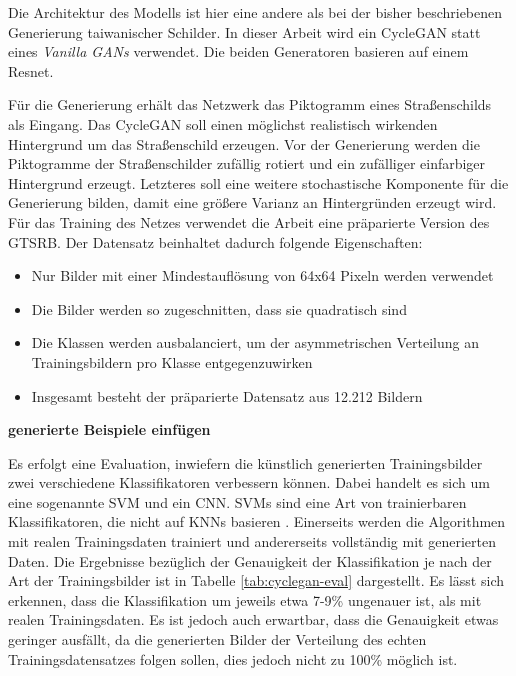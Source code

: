 Die Architektur des Modells ist hier eine andere als bei der bisher beschriebenen Generierung taiwanischer Schilder. In dieser Arbeit wird ein \ac{CycleGAN} statt eines \emph{Vanilla \acp{GAN}} verwendet. Die beiden Generatoren basieren auf einem Resnet. \cite{GTSRB} \cite{gtsrbGAN}

Für die Generierung erhält das Netzwerk das Piktogramm eines Straßenschilds als Eingang. Das \ac{CycleGAN} soll einen möglichst realistisch wirkenden Hintergrund um das Straßenschild erzeugen. Vor der Generierung werden die Piktogramme der Straßenschilder zufällig rotiert und ein zufälliger einfarbiger Hintergrund erzeugt. Letzteres soll eine weitere stochastische Komponente für die Generierung bilden, damit eine größere Varianz an Hintergründen erzeugt wird. Für das Training des Netzes verwendet die Arbeit eine präparierte Version des \ac{GTSRB}. Der Datensatz beinhaltet dadurch folgende Eigenschaften:
\begin{itemize}
    \item Nur Bilder mit einer Mindestauflösung von 64x64 Pixeln werden verwendet
    \item Die Bilder werden so zugeschnitten, dass sie quadratisch sind
    \item Die Klassen werden ausbalanciert, um der asymmetrischen Verteilung an Trainingsbildern pro Klasse entgegenzuwirken
    \item Insgesamt besteht der präparierte Datensatz aus 12.212 Bildern
  \end{itemize}
\cite{gtsrbGAN}

\textbf{generierte Beispiele einfügen}

Es erfolgt eine Evaluation, inwiefern die künstlich generierten Trainingsbilder zwei verschiedene Klassifikatoren verbessern können. Dabei handelt es sich um eine sogenannte \ac{SVM} und ein \ac{CNN}. \acp{SVM} sind eine Art von trainierbaren Klassifikatoren, die nicht auf \acp{KNN} basieren \cite{visualApproach}. Einerseits werden die Algorithmen mit realen Trainingsdaten trainiert und andererseits vollständig mit generierten Daten. Die Ergebnisse bezüglich der Genauigkeit der Klassifikation je nach der Art der Trainingsbilder ist in Tabelle \ref{tab:cyclegan-eval} dargestellt. Es lässt sich erkennen, dass die Klassifikation um jeweils etwa 7-9\% ungenauer ist, als mit realen Trainingsdaten. Es ist jedoch auch erwartbar, dass die Genauigkeit etwas geringer ausfällt, da die generierten Bilder der Verteilung des echten Trainingsdatensatzes folgen sollen, dies jedoch nicht zu 100\% möglich ist. \cite{gtsrbGAN}

